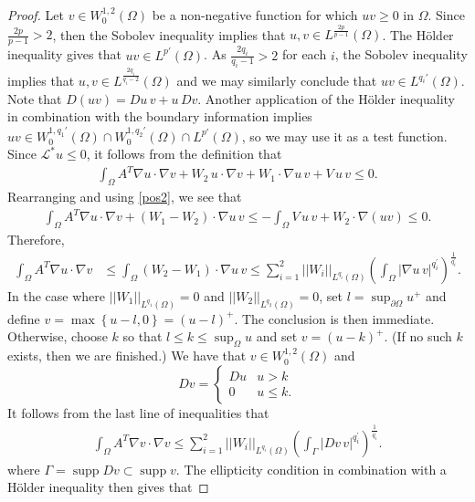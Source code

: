 \documentclass[12pt,reqno]{amsart}
\theoremstyle{plain}
\theoremstyle{definition}
\newcommand{\disp}{\displaystyle}
\DeclareMathOperator{\supp}{supp}
\newcommand{\Ga}{\Gamma}
\newcommand{\Om}{\Omega}
\newcommand{\del}{ \partial}
\newcommand{\su}{\subset}
\newcommand{\gr}{\nabla}
\newcommand{\norm}[1]{\left\vert \left\vert #1\right\vert\right\vert}
\newcommand{\abs}[1]{\left\vert#1\right\vert}
\newcommand{\set}[1]{\left\{#1\right\}}
\newcommand{\pr}[1]{\left( #1 \right) }
\begin{document}
\begin{appendix}
\begin{proof}
Let $v \in W^{1,2}_0\pr{\Om}$ be a non-negative function for which $u v \ge 0$ in $\Om$.
Since $\frac{2p}{p-1} > 2$, then the Sobolev inequality implies that $u, v \in L^{\frac{2p}{p-1}}\pr{\Om}$.
The H\"older inequality gives that $uv \in L^{p'}\pr{\Om}$. 
As $\frac{2q_i}{q_i-1} > 2$ for each $i$, the Sobolev inequality implies that $u, v \in L^{\frac{2q_i}{q_i-2}}\pr{\Om}$ and we may similarly conclude that $uv \in L^{q_i'}\pr{\Om}$. 
Note that $D\pr{u v} = D u \, v + u \, D v$.
Another application of the H\"older inequality in combination with the boundary information implies $uv \in W^{1, q_1'}_0\pr{\Om} \cap W^{1, q_2'}_0\pr{\Om} \cap L^{p'}\pr{\Om}$, so we may use it as a test function.
Since $\mathcal{L}^* u \le 0$, it follows from the definition that
\begin{align*}
\int_{\Om} A^T \gr u \cdot \gr v + W_2 \, u \cdot \gr v + W_1 \cdot \gr u \, v + V \, u \, v \le 0.
\end{align*}
Rearranging and using \eqref{pos2}, we see that
\begin{align*}
\int_{\Om} A^T \gr u \cdot \gr v + \pr{W_1 - W_2} \cdot \gr u \, v  \le - \int_{\Om} V \, u \, v + W_2 \cdot \gr\pr{u v} \le 0.
\end{align*}
Therefore,
\begin{align*}
\int_{\Om} A^T \gr u \cdot \gr v 
&\le \int_{\Om} \pr{W_2 - W_1} \cdot \gr u \, v
\le \sum_{i = 1}^2 \norm{W_i}_{L^{q_i}\pr{\Om}} \pr{\int_\Om \abs{\gr u \, v}^{q_i^\prime}}^{\frac 1 {q_i^\prime}}.
\end{align*}
%
In the case where $\norm{W_1}_{L^{q_1}\pr{\Om}} = 0$ and $\norm{W_2}_{L^{q_2}\pr{\Om}} = 0$, set $\disp l = \sup_{\del \Om} u^+$ and define $v = \max\set{u - l, 0}=(u-l)^+$.
The conclusion is then immediate.
Otherwise, choose $k$ so that $\disp l \le k \le \sup_{\Om} u$ and set $v = \pr{u - k}^+$.
(If no such $k$ exists, then we are finished.)
We have that $v \in W^{1,2}_0\pr{\Om}$ and 
$$D v = \left\{\begin{array}{ll} D u & u > k \\ 0 & u \le k.  \end{array}\right.$$
It follows from the last line of inequalities that
\begin{align*}
\int_{\Om} A^T \gr v \cdot \gr v 
\le \sum_{i = 1}^2 \norm{W_i}_{L^{q_i}\pr{\Om}} \pr{\int_\Ga \abs{D v \, v}^{q_i^\prime}}^{\frac 1 {q_i^\prime}}.
\end{align*}
where $\Ga = \supp Dv \su \supp v$.
The ellipticity condition in combination with a H\"older inequality then gives that

\end{proof}
\end{appendix}
\end{document}
